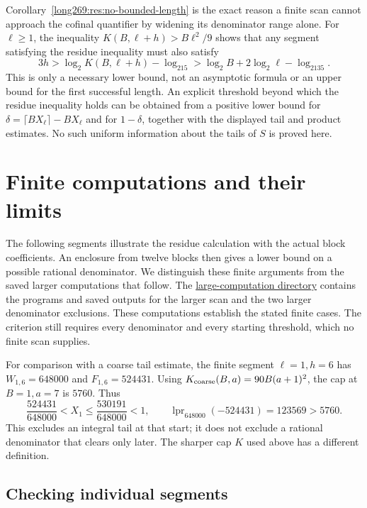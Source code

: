 \documentclass[11pt]{article}
\theoremstyle{remark}
\theoremstyle{plain}
\begin{document}
\noindent Corollary~\ref{long269:res:no-bounded-length} is the exact reason a finite
scan cannot approach the cofinal quantifier by widening its denominator range
alone.  For $\ell\ge1$, the inequality
$K(B,\ell+h)>B\ell^2/9$ shows that any segment satisfying the residue inequality must also satisfy
\[
 3h>\log_2K(B,\ell+h)-\log_215
    >\log_2B+2\log_2\ell-\log_2135.
\]
This is only a necessary lower bound, not an asymptotic formula or an
upper bound for the first successful length.
An explicit threshold beyond which the residue inequality holds can be obtained from a positive
lower bound for $\delta=\lceil BX_\ell\rceil-BX_\ell$ and for $1-\delta$,
together with the displayed tail and product estimates.  No such uniform information about the tails of $S$ is proved here.

\section{Finite computations and their limits}\label{long269:sec:evidence}

The following segments illustrate the residue calculation with the
actual block coefficients. An enclosure from twelve blocks then gives a lower
bound on a possible rational denominator. We distinguish these finite
arguments from the saved larger computations that follow.
The \href{https://github.com/wcook04/plectis-erdos/tree/f757115e03bebe5c04431a147da559015c680a37/research/experiments/erdos269/large-computations}{large-computation directory}
contains the programs and saved outputs for the larger scan and the two
larger denominator exclusions. These computations establish the stated
finite cases. The criterion still requires every denominator and every
starting threshold, which no finite scan supplies.

For comparison with a coarse tail estimate, the finite segment
$\ell=1,h=6$ has $W_{1,6}=648000$ and $F_{1,6}=524431$.
Using $K_{\rm coarse}(B,a)=90B(a+1)^2$, the cap at $B=1,a=7$ is $5760$.
Thus
\[
 \frac{524431}{648000}<X_1\le\frac{530191}{648000}<1,
 \qquad \operatorname{lpr}_{648000}(-524431)=123569>5760.
\]
This excludes an integral tail at that start; it does not exclude a
rational denominator that clears only later. The sharper cap $K$ used
above has a different definition.


\subsection{Checking individual segments}
\end{document}
